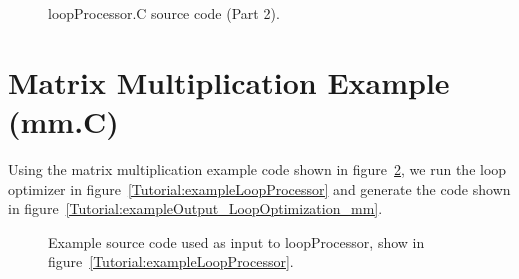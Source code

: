\begin{figure}[!h]
{\indent
{\mySmallFontSize


\begin{latexonly}
   
\end{latexonly}

\begin{htmlonly}
   
\end{htmlonly}

}
}
\caption{loopProcessor.C source code (Part 2).}
\label{Tutorial:exampleLoopProcessor2}
\end{figure}

\clearpage
\section{Matrix Multiplication Example (mm.C)}

   Using the matrix multiplication example code shown in 
figure~\ref{Tutorial:exampleInputCode_LoopOptimization_mm}, we run the loop optimizer in
figure~\ref{Tutorial:exampleLoopProcessor} and generate the code shown in 
figure~\ref{Tutorial:exampleOutput_LoopOptimization_mm}.

\begin{figure}[!h]
{\indent
{\mySmallFontSize


\begin{latexonly}
   
\end{latexonly}

\begin{htmlonly}
   
\end{htmlonly}

}
}
\caption{Example source code used as input to loopProcessor, show in figure~\ref{Tutorial:exampleLoopProcessor}.}
\label{Tutorial:exampleInputCode_LoopOptimization_mm}
\end{figure}

